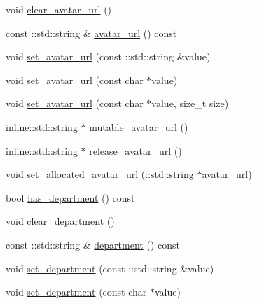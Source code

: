 \begin{DoxyCompactItemize}
void \hyperlink{class_i_m_1_1_base_define_1_1_client_user_info_aaa8367f7c648ebdef429c4fd63ebeed7}{clear\+\_\+avatar\+\_\+url} ()
\item 
const \+::std\+::string \& \hyperlink{class_i_m_1_1_base_define_1_1_client_user_info_a38d0f1131c2b82416ca2b4d2f2a7086d}{avatar\+\_\+url} () const 
\item 
void \hyperlink{class_i_m_1_1_base_define_1_1_client_user_info_a613104795bb0bd44e1982969d75c16c3}{set\+\_\+avatar\+\_\+url} (const \+::std\+::string \&value)
\item 
void \hyperlink{class_i_m_1_1_base_define_1_1_client_user_info_a2687054252fd03808167b9e2c37d77d6}{set\+\_\+avatar\+\_\+url} (const char $\ast$value)
\item 
void \hyperlink{class_i_m_1_1_base_define_1_1_client_user_info_a9e49d76c8a22bf9775f7f842a8fe5374}{set\+\_\+avatar\+\_\+url} (const char $\ast$value, size\+\_\+t size)
\item 
inline\+::std\+::string $\ast$ \hyperlink{class_i_m_1_1_base_define_1_1_client_user_info_a8223d4e0a14781084b2f09971e45b755}{mutable\+\_\+avatar\+\_\+url} ()
\item 
inline\+::std\+::string $\ast$ \hyperlink{class_i_m_1_1_base_define_1_1_client_user_info_a631544068dfbfc904f5f939b00237da6}{release\+\_\+avatar\+\_\+url} ()
\item 
void \hyperlink{class_i_m_1_1_base_define_1_1_client_user_info_a0e744acf9066c0c52f8efcd0df2180a4}{set\+\_\+allocated\+\_\+avatar\+\_\+url} (\+::std\+::string $\ast$\hyperlink{class_i_m_1_1_base_define_1_1_client_user_info_a38d0f1131c2b82416ca2b4d2f2a7086d}{avatar\+\_\+url})
\item 
bool \hyperlink{class_i_m_1_1_base_define_1_1_client_user_info_ae967a8e80295522e92020bb0a56a484b}{has\+\_\+department} () const 
\item 
void \hyperlink{class_i_m_1_1_base_define_1_1_client_user_info_ac7a91ba5249a32198da5a4e26f934ecf}{clear\+\_\+department} ()
\item 
const \+::std\+::string \& \hyperlink{class_i_m_1_1_base_define_1_1_client_user_info_ab77d3a5274727b8bf18d4cba269e8f89}{department} () const 
\item 
void \hyperlink{class_i_m_1_1_base_define_1_1_client_user_info_a6367067a66722bb0bef67850d97f4420}{set\+\_\+department} (const \+::std\+::string \&value)
\item 
void \hyperlink{class_i_m_1_1_base_define_1_1_client_user_info_a7dcbbbf7d2c58b82aa4516130c4078d1}{set\+\_\+department} (const char $\ast$value)
\item 

\end{DoxyCompactItemize}
